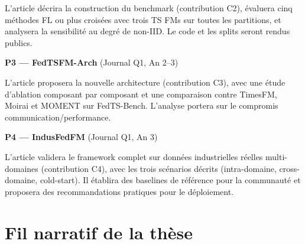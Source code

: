 \documentclass[12pt, a4paper]{report}
\begin{document}
L'article décrira la construction du benchmark (contribution C2), évaluera cinq
méthodes FL ou plus croisées avec trois TS FMs sur toutes les partitions, et analysera
la sensibilité au degré de non-IID. Le code et les splits seront rendus publics.

\textbf{P3 — FedTSFM-Arch} (Journal Q1, An 2--3)

L'article proposera la nouvelle architecture (contribution C3), avec une étude
d'ablation composant par composant et une comparaison contre TimesFM, Moirai et
MOMENT sur FedTS-Bench. L'analyse portera sur le compromis communication/performance.

\textbf{P4 — IndusFedFM} (Journal Q1, An 3)

L'article validera le framework complet sur données industrielles réelles multi-domaines
(contribution C4), avec les trois scénarios décrits (intra-domaine, cross-domaine,
cold-start). Il établira des baselines de référence pour la communauté et proposera
des recommandations pratiques pour le déploiement.

\section{Fil narratif de la thèse}
\end{document}
